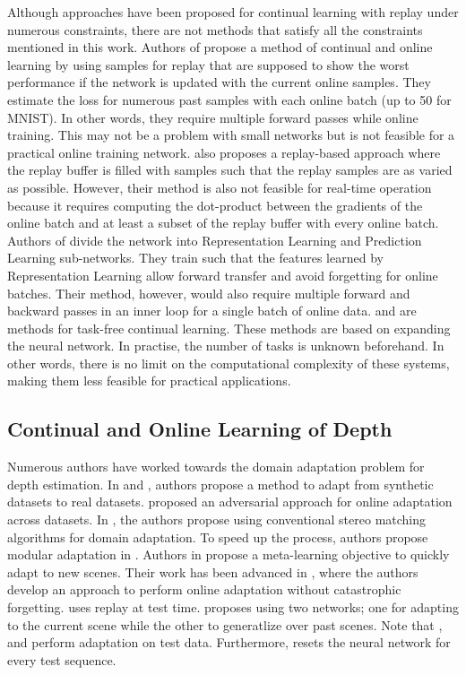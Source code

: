 \documentclass[lettersize,journal]{IEEEtran}
\begin{document}
 Although approaches have been proposed for continual learning with replay under numerous constraints, there are not methods that satisfy all the constraints mentioned in this work. Authors of \cite{aljundi2019online} propose a method of continual and online learning by using samples for replay that are supposed to show the worst performance if the network is updated with the current online samples. They estimate the loss for numerous past samples with each online batch (up to 50 for MNIST). In other words, they require multiple forward passes while online training. This may not be a problem with small networks but is not feasible for a practical online training network. \cite{aljundi2019gradient} also proposes a replay-based approach where the replay buffer is filled with samples such that the replay samples are as varied as possible. However, their method is also not feasible for real-time operation because it requires computing the dot-product between the gradients of the online batch and at least a subset of the replay buffer with every online batch. Authors of \cite{javed2019meta} divide the network into Representation Learning and Prediction Learning sub-networks. They train such that the features learned by Representation Learning allow forward transfer and avoid forgetting for online batches. Their method, however, would also require multiple forward and backward passes in an inner loop for a single batch of online data. \cite{rao2019continual} and \cite{lee2019neural} are methods for task-free continual learning. These methods are based on expanding the neural network. In practise, the number of tasks is unknown beforehand. In other words, there is no limit on the computational complexity of these systems, making them less feasible for practical applications.

 
 \subsection{Continual and Online Learning of Depth}
\noindent Numerous authors have worked towards the domain adaptation problem for depth estimation. In \cite{zhang2020depth} and \cite{zheng2018t2net}, authors propose a method to adapt from synthetic datasets to real datasets. \cite{sun2022learn} proposed an adversarial approach for online adaptation across datasets. In \cite{tonioni2017unsupervised}, the authors propose using conventional stereo matching algorithms for domain adaptation. To speed up the process, authors propose modular adaptation in \cite{tonioni2019real}. Authors in \cite{tonioni2019learning} propose a meta-learning objective to quickly adapt to new scenes. Their work has been advanced in \cite{zhang2020online}, where the authors develop an approach to perform online adaptation without catastrophic forgetting. \cite{kuznietsov2021comoda} uses replay at test time.  \cite{vodisch2022continual} proposes using two networks; one for adapting to the current scene while the other to generatlize over past scenes. Note that \cite{tonioni2019learning}, \cite{zhang2020online} and \cite{kuznietsov2021comoda} perform adaptation on test data. Furthermore, \cite{tonioni2019real} resets the neural network for every test sequence. 
 
\end{document}
